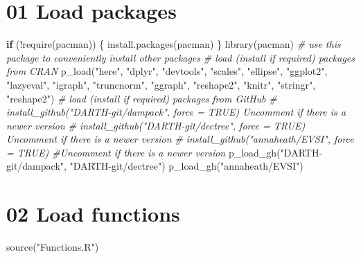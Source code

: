 \documentclass[
]{article}
\newenvironment{Shaded}{\begin{snugshade}}{\end{snugshade}}
\newcommand{\CommentTok}[1]{\textcolor[rgb]{0.56,0.35,0.01}{\textit{#1}}}
\newcommand{\ControlFlowTok}[1]{\textcolor[rgb]{0.13,0.29,0.53}{\textbf{#1}}}
\newcommand{\FunctionTok}[1]{\textcolor[rgb]{0.00,0.00,0.00}{#1}}
\newcommand{\NormalTok}[1]{#1}
\newcommand{\SpecialCharTok}[1]{\textcolor[rgb]{0.00,0.00,0.00}{#1}}
\newcommand{\StringTok}[1]{\textcolor[rgb]{0.31,0.60,0.02}{#1}}
\begin{document}
\hypertarget{load-packages}{%
\section{01 Load packages}\label{load-packages}}

\begin{Shaded}
\begin{Highlighting}[]
\ControlFlowTok{if}\NormalTok{ (}\SpecialCharTok{!}\FunctionTok{require}\NormalTok{(}\StringTok{\textquotesingle{}pacman\textquotesingle{}}\NormalTok{)) \{}
  \FunctionTok{install.packages}\NormalTok{(}\StringTok{\textquotesingle{}pacman\textquotesingle{}}\NormalTok{)}
\NormalTok{\}}
\FunctionTok{library}\NormalTok{(pacman) }\CommentTok{\# use this package to conveniently install other packages}
\CommentTok{\# load (install if required) packages from CRAN}
\FunctionTok{p\_load}\NormalTok{(}\StringTok{"here"}\NormalTok{, }\StringTok{"dplyr"}\NormalTok{, }\StringTok{"devtools"}\NormalTok{, }\StringTok{"scales"}\NormalTok{, }\StringTok{"ellipse"}\NormalTok{, }\StringTok{"ggplot2"}\NormalTok{, }\StringTok{"lazyeval"}\NormalTok{, }
       \StringTok{"igraph"}\NormalTok{, }\StringTok{"truncnorm"}\NormalTok{, }\StringTok{"ggraph"}\NormalTok{, }\StringTok{"reshape2"}\NormalTok{, }\StringTok{"knitr"}\NormalTok{, }\StringTok{"stringr"}\NormalTok{, }\StringTok{"reshape2"}\NormalTok{)                                            }
\CommentTok{\# load (install if required) packages from GitHub}
\CommentTok{\# install\_github("DARTH{-}git/dampack", force = TRUE) Uncomment if there is a newer version}
\CommentTok{\# install\_github("DARTH{-}git/dectree", force = TRUE) Uncomment if there is a newer version}
\CommentTok{\# install\_github("annaheath/EVSI", force = TRUE) \#Uncomment if there is a newer version}
\FunctionTok{p\_load\_gh}\NormalTok{(}\StringTok{"DARTH{-}git/dampack"}\NormalTok{, }\StringTok{"DARTH{-}git/dectree"}\NormalTok{)}
\FunctionTok{p\_load\_gh}\NormalTok{(}\StringTok{"annaheath/EVSI"}\NormalTok{)}
\end{Highlighting}
\end{Shaded}

\hypertarget{load-functions}{%
\section{02 Load functions}\label{load-functions}}

\begin{Shaded}
\begin{Highlighting}[]
\FunctionTok{source}\NormalTok{(}\StringTok{"Functions.R"}\NormalTok{)}
\end{Highlighting}
\end{Shaded}
\end{document}
